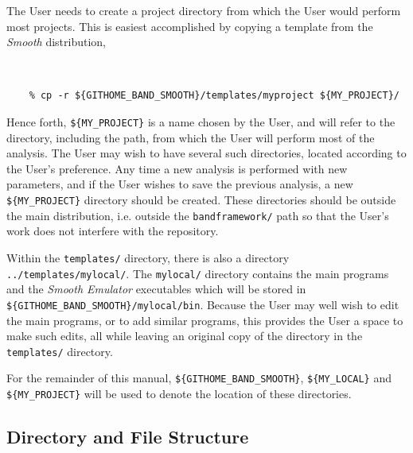 \documentclass[UserManual.tex]{subfiles}
\begin{document}
The User needs to create a project directory from which the User would perform most projects. This is easiest accomplished by copying a template from the {\it Smooth} distribution,
{\tt
\begin{verbatim}
    % cp -r ${GITHOME_BAND_SMOOTH}/templates/myproject ${MY_PROJECT}/
\end{verbatim}
}
Hence forth, {\tt \$\{MY\_PROJECT\}} is a name chosen by the User, and will refer to the directory, including the path, from which the User will perform most of the analysis. The User may wish to have several such directories, located according to the User's preference. Any time a new analysis is performed with new parameters, and if the User wishes to save the previous analysis, a new {\tt \$\{MY\_PROJECT\}} directory should be created. These directories should be outside the main distribution, i.e. outside the {\tt bandframework/} path so that the User's work does not interfere with the repository. 

Within the {\tt templates/} directory, there is also a directory {\tt ../templates/mylocal/}. The {\tt mylocal/} directory contains the main programs and the {\it Smooth Emulator} executables which will be stored in {\tt \$\{GITHOME\_BAND\_SMOOTH\}/mylocal/bin}. Because the User may well wish to edit the main programs, or to add similar programs, this provides the User a space to make such edits, all while leaving an original copy of the directory in the {\tt templates/} directory. 

For the remainder of this manual, {\tt \$\{GITHOME\_BAND\_SMOOTH\}}, {\tt \$\{MY\_LOCAL\}} and {\tt \$\{MY\_PROJECT\}} will be used to denote the location of these directories.

\subsection{Directory and File Structure}
\end{document}
